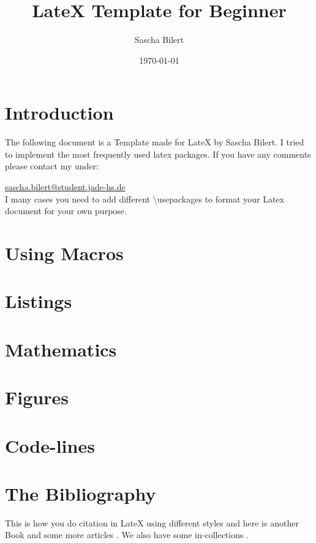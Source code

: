 \documentclass[11pt, a4paper]{article}
\begin{document}
\title{LateX Template for Beginner}
\author{Sascha Bilert}
\date{\today}
\maketitle
\thispagestyle{empty}
\tableofcontents

\pagebreak


\section{Introduction}

The following document is a Template made for LateX by Sascha Bilert. I tried to implement the most frequently used latex packages. If you have any comments please contact my under:

\url{sascha.bilert@student.jade-hs.de}\\
I many cases you need to add different \textbackslash usepackages to format your Latex document for your own purpose.


\section{Using Macros}

\section{Listings}

\section{Mathematics}

\section{Figures}

\section{Code-lines}

\section{The Bibliography}

This is how you do citation in LateX using different styles \cite{holube2010development} and here is another Book \cite{yost2013hearing} and some more articles \cite{verhey1999within}. We also have some in-collections \cite{bitzer2001superdirective}.




\end{document}
